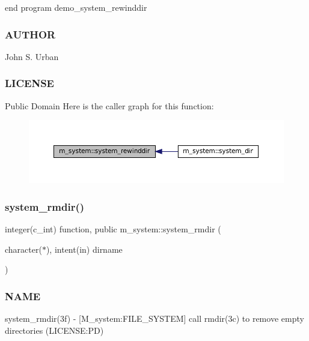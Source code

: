 end program demo\+\_\+system\+\_\+rewinddir \subsubsection*{A\+U\+T\+H\+OR}

John S. Urban \subsubsection*{L\+I\+C\+E\+N\+SE}

Public Domain Here is the caller graph for this function\+:\nopagebreak
\begin{figure}[H]
\begin{center}
\leavevmode
\includegraphics[width=350pt]{namespacem__system_a3ffe757195ade8052e8acabd196ee3ca_icgraph}
\end{center}
\end{figure}
\mbox{\label{namespacem__system_a21fd3e1ccd50cef6adc539ef3d7a9836}} 
\subsubsection{\texorpdfstring{system\+\_\+rmdir()}{system\_rmdir()}}
{\footnotesize\ttfamily integer(c\+\_\+int) function, public m\+\_\+system\+::system\+\_\+rmdir (\begin{DoxyParamCaption}\item[{character($\ast$), intent(in)}]{dirname }\end{DoxyParamCaption})}



\subsubsection*{N\+A\+ME}

system\+\_\+rmdir(3f) -\/ \mbox{[}M\+\_\+system\+:F\+I\+L\+E\+\_\+\+S\+Y\+S\+T\+EM\mbox{]} call rmdir(3c) to remove empty directories (L\+I\+C\+E\+N\+SE\+:PD) 

